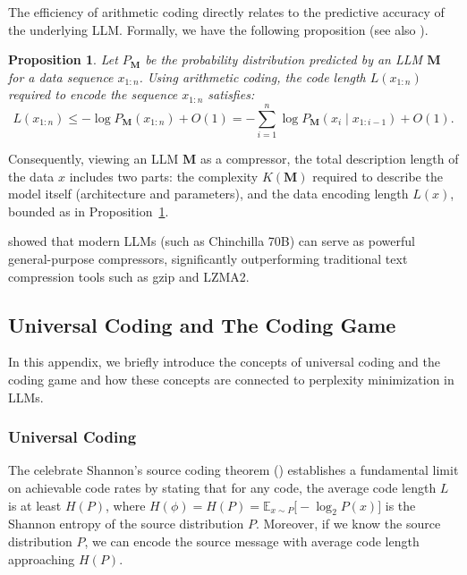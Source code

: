 \documentclass[11pt]{article}
\theoremstyle{plain}
\newtheorem{proposition}[theorem]{Proposition}
\theoremstyle{definition}
\newcommand{\codelength}{L}
\newcommand{\llm}{\boldsymbol{M}}
\begin{document}
The efficiency of arithmetic coding directly relates to the predictive accuracy of the underlying LLM. Formally, we have the following proposition
\citep{rissanen1976generalized}
(see also \cite[Ch. 13]{cover2006elements}).

\begin{proposition}
\label{prop:arithmeticcode}
Let \(P_{\llm}\) be the probability distribution predicted by an LLM $\llm$ for a data sequence \(x_{1:n}\). Using arithmetic coding, the code length 
$\codelength(x_{1:n})$ required to encode the sequence \(x_{1:n}\) satisfies:
$$
\codelength(x_{1:n}) \leq -\log P_{\llm}(x_{1:n}) + O(1) = -\sum_{i=1}^n \log P_{\llm}(x_i \mid x_{1:i-1}) + O(1).
$$
\end{proposition}

Consequently, viewing an LLM $\llm$ as a compressor, the total description length of the data \(x\) includes two parts: the complexity \(K(\llm)\) required to describe the model itself (architecture and parameters), and the data encoding length \(\codelength(x)\), bounded as in
Proposition~\ref{prop:arithmeticcode}.

\citep{deletanglanguage,li2025lossless} showed that modern LLMs 
(such as Chinchilla 70B) can serve as powerful general-purpose compressors, significantly outperforming traditional text compression tools such as gzip and LZMA2.

\subsection{Universal Coding and The Coding Game}
\label{subsec:universalcoding_codinggame}
In this appendix, we briefly introduce the concepts 
of universal coding and the coding game and 
how these concepts are connected to perplexity 
minimization in LLMs.


\subsubsection{Universal Coding}

The celebrate Shannon’s source coding theorem (\cite{Shannon1948}) establishes a fundamental limit on achievable code rates by stating that for any code, the average code length $L$
is at least
$H(P)$, 
where 
\(\displaystyle 
H(\phi) =
H(P)=\mathbb{E}_{x \sim P}\bigl[-\log_2 P(x)\bigr]
\)
is the Shannon entropy of the source distribution $P$. Moreover, if we know the source distribution $P$,
we can encode the source message with average code length approaching $H(P)$.
\end{document}
